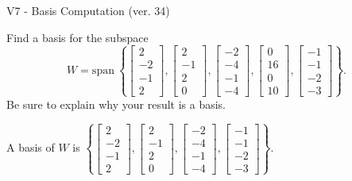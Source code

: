 \begin{exercise}
  \begin{exerciseTitle}V7 - Basis Computation (ver. 34)\end{exerciseTitle}
  \begin{exerciseStatement}
    Find a basis for the subspace 
\[W=\mathrm{span}\ \left\{\left[\begin{array}{r}
2 \\
-2 \\
-1 \\
2
\end{array}\right] , \left[\begin{array}{r}
2 \\
-1 \\
2 \\
0
\end{array}\right] , \left[\begin{array}{r}
-2 \\
-4 \\
-1 \\
-4
\end{array}\right] , \left[\begin{array}{r}
0 \\
16 \\
0 \\
10
\end{array}\right] , \left[\begin{array}{r}
-1 \\
-1 \\
-2 \\
-3
\end{array}\right]\right\}.\]
 Be sure to explain why your result is a basis.


  \end{exerciseStatement}
  \begin{exerciseAnswer}
   A basis of \(W\) is  \(\left\{\left[\begin{array}{r}
2 \\
-2 \\
-1 \\
2
\end{array}\right] , \left[\begin{array}{r}
2 \\
-1 \\
2 \\
0
\end{array}\right] , \left[\begin{array}{r}
-2 \\
-4 \\
-1 \\
-4
\end{array}\right] , \left[\begin{array}{r}
-1 \\
-1 \\
-2 \\
-3
\end{array}\right]\right\}\).
  


  \end{exerciseAnswer}
\end{exercise}